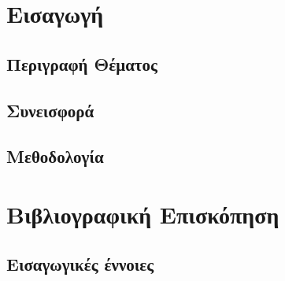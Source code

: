 \documentclass[11pt]{report}
\begin{document}



\setcounter{page}{0}



\tableofcontents
\newpage\phantom{~}\newpage



\setcounter{page}{0}    %

\chapter{Εισαγωγή}

\section{Περιγραφή Θέματος}


\section{Συνεισφορά}


\section{Μεθοδολογία}


\chapter{Βιβλιογραφική Επισκόπηση}

\section{Εισαγωγικές έννοιες}

\end{document}
